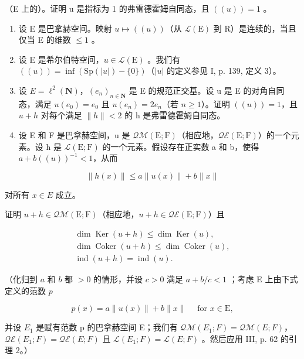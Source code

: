 （E 上的）。证明 u 是指标为 1 的弗雷德霍姆自同态，且 \(((u)) = 1\) 。

\begin{enumerate}
\def\labelenumi{\arabic{enumi})}
\setcounter{enumi}{3}
\item
  设 E 是巴拿赫空间。映射 \(u \mapsto ((u))\)（从 \(\mathcal{L}(\mathrm{E})\) 到 R）是连续的，当且仅当 E 的维数 \(\leqslant 1\) 。
\item
  设 E 是希尔伯特空间，\(u \in \mathcal{L}(\mathrm{E})\) 。我们有 \(((u)) = \inf(\mathrm{Sp}(|u|) - \{0\})\)（\(|u|\) 的定义参见 I, p. 139, 定义 3）。
\item
  设 \(E = \ell^{2}(\mathbf{N})\)，\((e_{n})_{n \in \mathbf{N}}\) 是 E 的规范正交基。设 u 是 E 的对角自同态，满足 \(u(e_{0}) = e_{0}\) 且 \(u(e_{n}) = 2e_{n}\)（若 \(n \geqslant 1\)）。证明 \(((u)) = 1\)，且 \(u + h\) 对每个满足 \(\|h\| < 2\) 的 h 是弗雷德霍姆自同态。
\item
  设 E 和 F 是巴拿赫空间，u 是 \(\mathcal{Q}\mathcal{M}(\mathrm{E};\mathrm{F})\)（相应地，\(\mathcal{Q}\mathcal{E}(\mathrm{E};\mathrm{F})\)）的一个元素。设 h 是 \(\mathcal{L}(\mathrm{E};\mathrm{F})\) 的一个元素。假设存在正实数 a 和 b，使得 \(a + b((u))^{-1} < 1\)，从而
\end{enumerate}

\[
\| h (x) \| \leqslant a \| u (x) \| + b \| x \|\tag{2}
\]

对所有 \(x \in E\) 成立。

证明 \(u + h \in \mathcal{Q}\mathcal{M}(\mathrm{E};\mathrm{F})\)（相应地，\(u + h \in \mathcal{Q}\mathcal{E}(\mathrm{E};\mathrm{F})\)）且

\[
\begin{array}{c} \dim \operatorname{Ker} (u + h) \leqslant \dim \operatorname{Ker} (u), \\ \dim \operatorname{Coker} (u + h) \leqslant \dim \operatorname{Coker} (u), \\ \operatorname{ind} (u + h) = \operatorname{ind} (u). \end{array}
\]

（化归到 \(a\) 和 \(b\) 都 \(>0\) 的情形，并设 \(c > 0\) 满足 \(a + b/c < 1\) ；考虑 E 上由下式定义的范数 \(p\)

\[
p (x) = a \| u (x) \| + b \| x \| \quad \text {   for   } x \in \mathrm{E},
\]

并设 \(E_{1}\) 是赋有范数 p 的巴拿赫空间 E；我们有 \(\mathcal{Q}\mathcal{M}(E_{1};F)=\mathcal{Q}\mathcal{M}(E;F)\)，\(\mathcal{Q}\mathcal{E}(E_{1};F)=\mathcal{Q}\mathcal{E}(E;F)\) 且 \(\mathcal{L}(E_{1};F)=\mathcal{L}(E;F)\) 。然后应用 III, p. 62 的引理 2。）

